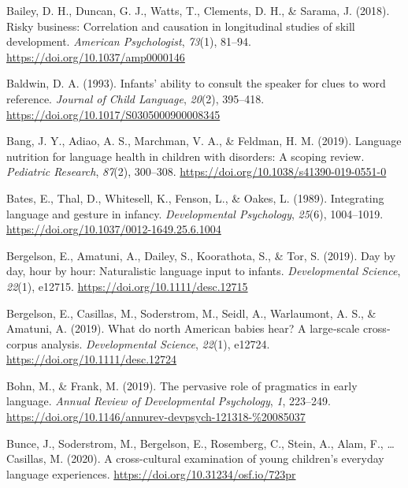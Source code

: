 \documentclass[
  english,
  man,floatsintext]{apa6}
\begin{document}
\leavevmode\hypertarget{ref-bailey_risky_2018}{}%
Bailey, D. H., Duncan, G. J., Watts, T., Clements, D. H., \& Sarama, J. (2018). Risky business: Correlation and causation in longitudinal studies of skill development. \emph{American Psychologist}, \emph{73}(1), 81--94. \url{https://doi.org/10.1037/amp0000146}

\leavevmode\hypertarget{ref-baldwin_infants_1993}{}%
Baldwin, D. A. (1993). Infants' ability to consult the speaker for clues to word reference. \emph{Journal of Child Language}, \emph{20}(2), 395--418. \url{https://doi.org/10.1017/S0305000900008345}

\leavevmode\hypertarget{ref-bang_language_2019}{}%
Bang, J. Y., Adiao, A. S., Marchman, V. A., \& Feldman, H. M. (2019). Language nutrition for language health in children with disorders: A scoping review. \emph{Pediatric Research}, \emph{87}(2), 300--308. \url{https://doi.org/10.1038/s41390-019-0551-0}

\leavevmode\hypertarget{ref-bates_integrating_1989}{}%
Bates, E., Thal, D., Whitesell, K., Fenson, L., \& Oakes, L. (1989). Integrating language and gesture in infancy. \emph{Developmental Psychology}, \emph{25}(6), 1004--1019. \url{https://doi.org/10.1037/0012-1649.25.6.1004}

\leavevmode\hypertarget{ref-bergelson_day_2019}{}%
Bergelson, E., Amatuni, A., Dailey, S., Koorathota, S., \& Tor, S. (2019). Day by day, hour by hour: Naturalistic language input to infants. \emph{Developmental Science}, \emph{22}(1), e12715. \url{https://doi.org/10.1111/desc.12715}

\leavevmode\hypertarget{ref-bergelson_what_2019}{}%
Bergelson, E., Casillas, M., Soderstrom, M., Seidl, A., Warlaumont, A. S., \& Amatuni, A. (2019). What do north American babies hear? A large‐scale cross‐corpus analysis. \emph{Developmental Science}, \emph{22}(1), e12724. \url{https://doi.org/10.1111/desc.12724}

\leavevmode\hypertarget{ref-bohn_pervasive_2019}{}%
Bohn, M., \& Frank, M. (2019). The pervasive role of pragmatics in early language. \emph{Annual Review of Developmental Psychology}, \emph{1}, 223--249. \url{https://doi.org/10.1146/annurev-devpsych-121318-\%20085037}

\leavevmode\hypertarget{ref-bunce_cross-cultural_2020}{}%
Bunce, J., Soderstrom, M., Bergelson, E., Rosemberg, C., Stein, A., Alam, F., \ldots{} Casillas, M. (2020). A cross-cultural examination of young children's everyday language experiences. \url{https://doi.org/10.31234/osf.io/723pr}
\end{document}
